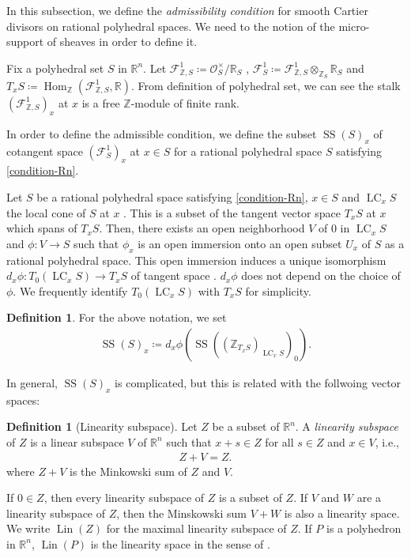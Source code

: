 \documentclass[a4paper,dvipdfmx,reqno,12pt]{amsart}
\theoremstyle{definition}
\newtheorem{definition}[theorem]{Definition}
\newcommand{\deq}{\coloneqq}
\newcommand{\opn}[1]{\operatorname{#1}}
\numberwithin{equation}{section}
\begin{document}
In this subsection, we define 
the \emph{admissibility condition} for
smooth Cartier divisors on rational 
polyhedral spaces.
We need to the notion of 
the micro-support of sheaves in order to define it.





Fix a polyhedral set $S$ 
in $\mathbb{R}^{n}$.
Let 
$\mathcal{F}^{1}_{\mathbb{Z},S}
\deq \mathcal{O}^{\times}_S/\mathbb{R}_{S}$
,
$\mathcal{F}^{1}_{S}\deq 
\mathcal{F}^{1}_{\mathbb{Z},S}
\otimes_{\mathbb{Z}_S} \mathbb{R}_S$ 
and $T_x S\deq \opn{Hom}_{\mathbb{Z}}(
\mathcal{F}^{1}_{\mathbb{Z},S},\mathbb{R})$.
From definition of polyhedral set, 
we can see 
the stalk $(\mathcal{F}^{1}_{\mathbb{Z},S})_x$
at $x$ is a free 
$\mathbb{Z}$-module of finite rank.

In order to define the admissible condition,
we define the subset $\opn{SS}(S)_x$ of cotangent
space $(\mathcal{F}^{1}_{S})_x$ at $x\in S$ for 
a rational polyhedral
space $S$ satisfying \cref{condition-Rn}.


Let $S$ be a rational polyhedral space satisfying
\cref{condition-Rn}, $x\in S$ and $\opn{LC}_x S$ the 
local cone of $S$ at $x$ 
\cite[2.2]{gross2019sheaftheoretic}.
This is a subset of the tangent vector space
$T_{x}S$ at $x$ which spans of $T_{x}S$.
Then, there exists an open neighborhood 
$V$ of $0$ in $\opn{LC}_x S$ and $\phi \colon V\to S$ 
such that $\phi_x$ is an open immersion onto an 
open subset $U_x$ of $S$ as a 
rational polyhedral space.
This open immersion induces a unique isomorphism
$d_x\phi\colon T_0(\opn{LC}_xS) \to T_x S$
of tangent space 
\cite[Proposition 2.5]{gross2019sheaftheoretic}.
$d_x \phi$ does not depend on the choice of 
$\phi$. We frequently identify $T_0(\opn{LC}_x S)$ with 
$T_x S$ for simplicity.
\begin{definition}
For the above notation, we set
\begin{align}
\opn{SS}(S)_x\deq 
d_x\phi(\opn{SS}((\mathbb{Z}_{T_x S})_{\opn{LC}_x S})_0).
\end{align}

\end{definition}



In general, $\opn{SS}(S)_x$  
is complicated, but this is related with the 
follwoing vector 
spaces:

\begin{definition}[{Linearity subspace}]
Let $Z$ be a subset of
$\mathbb{R}^{n}$. A \emph{linearity subspace} of $Z$ is 
a linear subspace $V$ of
$\mathbb{R}^{n}$ such that $x+s\in Z$ for all 
$s\in Z$ and $x\in V$, i.e.,
\begin{align}
Z+V=Z.
\end{align}
where $Z+V$ is the Minkowski sum of $Z$ and $V$.
\end{definition}
If $0\in Z$, then 
every linearity subspace of $Z$ is a subset of $Z$.
If $V$ and $W$ are a linearity subspace of $Z$, 
then the Minskowski sum $V+W$ is 
also a linearity space.
We write $\opn{Lin}(Z)$ for the maximal linearity 
subspace of $Z$. If $P$ is a polyhedron in 
$\mathbb{R}^{n}$, $\opn{Lin}(P)$ is the linearity space
in the sense of \cite[p.60]{MR3287221}.
\end{document}
